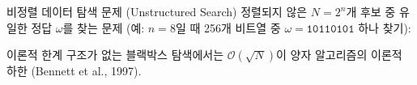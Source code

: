 \documentclass[aspectratio=169, 10pt]{beamer}
\begin{document}
\begin{frame}{비정렬 데이터 탐색 문제 (Unstructured Search)}
    정렬되지 않은 $N = 2^n$개 후보 중 유일한 정답 $\omega$를 찾는 문제 (예: $n=8$일 때 256개 비트열 중 $\omega = \texttt{10110101}$ 하나 찾기):
    \pause
    \vspace{0.15cm}
    \begin{center}
    \end{center}
    \pause
    \vspace{0.15cm}
    \begin{qctip}{이론적 한계}
        구조가 없는 블랙박스 탐색에서는 $\mathcal{O}(\sqrt{N})$이 양자 알고리즘의 이론적 하한 (Bennett et al., 1997).
    \end{qctip}
\end{frame}
\end{document}
